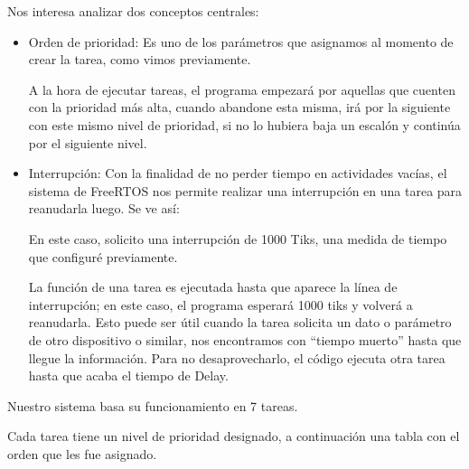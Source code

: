                     Nos interesa analizar dos conceptos centrales:\par
                    \begin{itemize} [label=•]
                        \setlength{\itemindent}{1.5em}
                        \item Orden de prioridad: Es uno de los parámetros que asignamos al momento de crear la tarea, como vimos previamente.\par
                        A la hora de ejecutar tareas, el programa empezará por aquellas que cuenten con la prioridad más alta, cuando abandone esta misma, irá por la siguiente con este mismo nivel de prioridad, si no lo hubiera baja un escalón y continúa por el siguiente nivel.\par
                        \item Interrupción: Con la finalidad de no perder tiempo en actividades vacías, el sistema de FreeRTOS nos permite realizar una interrupción en una tarea para reanudarla luego. Se ve así:\par
                        \par
                        En este caso, solicito una interrupción de 1000 Tiks, una medida de tiempo que configuré previamente.\par
                        La función de una tarea es ejecutada hasta que aparece la línea de interrupción; en este caso, el programa esperará 1000 tiks y volverá a reanudarla. Esto puede ser útil cuando la tarea solicita un dato o parámetro de otro dispositivo o similar, nos encontramos con “tiempo muerto” hasta que llegue la información. Para no desaprovecharlo, el código ejecuta otra tarea hasta que acaba el tiempo de Delay.\par
                        \end{itemize}
                    
                    Nuestro sistema basa su funcionamiento en 7 tareas.\par
                    Cada tarea tiene un nivel de prioridad designado, a continuación una tabla con el orden que les fue asignado.\par
                    

